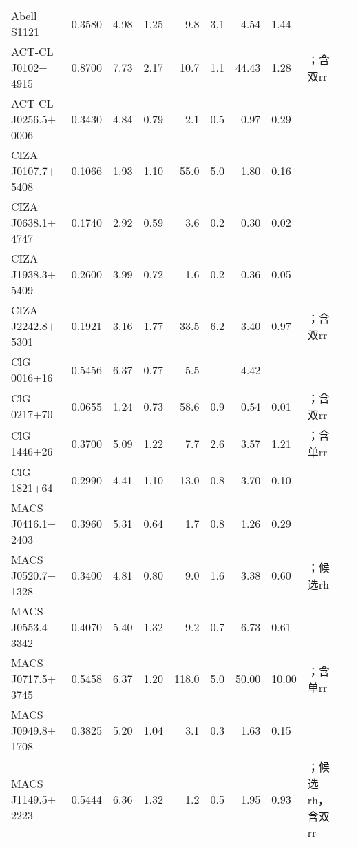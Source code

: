 \begin{ThreePartTable}
\begin{longtable}{lcccr@{$\,\pm\,$}lr@{$\,\pm\,$}lll}
Abell S1121          & 0.3580 & 4.98 & 1.25 &   9.8 &  3.1\tnote{h} &  4.54 &  1.44 & \parencite{duchesne2017}  \\
ACT-CL J0102$-$4915  & 0.8700 & 7.73 & 2.17 &  10.7 &  1.1\tnote{i} & 44.43 &  1.28 & \parencite{lindner2014}；含双\acl{rr}  \\
ACT-CL J0256.5$+$0006 & 0.3430 & 4.84 & 0.79 &   2.1 &  0.5\tnote{i} &  0.97 &  0.29 & \parencite{knowles2016}  \\
CIZA J0107.7$+$5408  & 0.1066 & 1.93 & 1.10 &  55.0 &  5.0 &  1.80 &  0.16 & \parencite{vanWeeren2011}  \\
CIZA J0638.1$+$4747  & 0.1740 & 2.92 & 0.59 &   3.6 &  0.2 &  0.30 &  0.02 & \parencite{cuciti2018}  \\
CIZA J1938.3$+$5409  & 0.2600 & 3.99 & 0.72 &   1.6 &  0.2\tnote{b} &  0.36 &  0.05 & \parencite{bonafede2015}  \\
CIZA J2242.8$+$5301  & 0.1921 & 3.16 & 1.77 &  33.5 &  6.2\tnote{j} &  3.40 &  0.97 & \parencite{govoni2012}；含双\acl{rr}  \\
ClG 0016+16          & 0.5456 & 6.37 & 0.77 &   5.5 &  --- &  4.42 &  ---  & \parencite{giovannini2000}  \\
ClG 0217+70          & 0.0655 & 1.24 & 0.73 &  58.6 &  0.9 &  0.54 &  0.01 & \parencite{brown2011}；含双\acl{rr}  \\
ClG 1446+26          & 0.3700 & 5.09 & 1.22 &   7.7 &  2.6 &  3.57 &  1.21 & \parencite{govoni2012}；含单\acl{rr}  \\
ClG 1821+64          & 0.2990 & 4.41 & 1.10 &  13.0 &  0.8\tnote{k} &  3.70 &  0.10 & \parencite{bonafede2014b}  \\
MACS J0416.1$-$2403  & 0.3960 & 5.31 & 0.64 &   1.7 &  0.8\tnote{l} &  1.26 &  0.29 & \parencite{pandeyPommier2015}  \\
MACS J0520.7$-$1328  & 0.3400 & 4.81 & 0.80 &   9.0 &  1.6 &  3.38 &  0.60 & \parencite{macario2014}；候选\acl{rh}  \\
MACS J0553.4$-$3342  & 0.4070 & 5.40 & 1.32 &   9.2 &  0.7\tnote{b} &  6.73 &  0.61 & \parencite{bonafede2012}  \\
MACS J0717.5$+$3745  & 0.5458 & 6.37 & 1.20 & 118.0 &  5.0 & 50.00 & 10.00 & \parencite{vanWeeren2009}；含单\acl{rr}  \\
MACS J0949.8$+$1708  & 0.3825 & 5.20 & 1.04 &   3.1 &  0.3\tnote{b} &  1.63 &  0.15 & \parencite{bonafede2015}  \\
MACS J1149.5$+$2223  & 0.5444 & 6.36 & 1.32 &   1.2 &  0.5 &  1.95 &  0.93 & \parencite{bonafede2012}；候选\acl{rh}，含双\acl{rr}  \\

\end{longtable}
\end{ThreePartTable}

